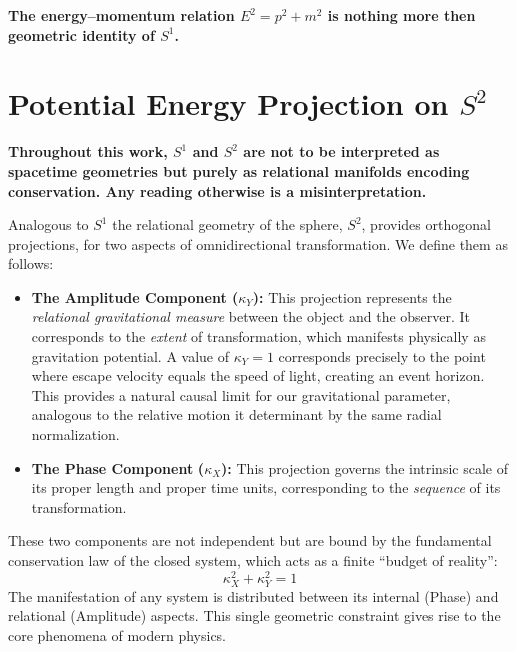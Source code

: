\documentclass[12pt, a4paper]{article}
\begin{document}
\begin{tcolorbox}[colback=gray!5, colframe=black!80!black, title=Summary:]
\textbf{The energy--momentum relation $E^{2}=p^{2}+m^{2}$ is nothing more then geometric identity of $S^1$.}
\end{tcolorbox}

\section{Potential Energy Projection on $S^2$}

\begin{tcolorbox}[colback=gray!5, colframe=black!80!black, title=IMPORTANT:]
\textbf{Throughout this work, $S^1$ and $S^2$ are not to be interpreted as spacetime geometries but purely as relational manifolds encoding conservation. Any reading otherwise is a misinterpretation.}
\end{tcolorbox}

Analogous to $S^1$ the relational geometry of the sphere, $S^2$, provides orthogonal projections,  for two aspects of omnidirectional transformation. We define them as follows:

\begin{itemize}
    \item \textbf{The Amplitude Component ($\kappa_Y$):} This projection represents the \textit{relational gravitational measure} between the object and the observer. It corresponds to the \textit{extent} of transformation, which manifests physically as gravitation potential. A value of $\kappa_Y=1$ corresponds precisely to the point where escape velocity equals the speed of light, creating an event horizon. This provides a natural causal limit for our gravitational parameter, analogous to the relative motion it determinant by the same radial normalization.

    \item \textbf{The Phase Component}\textbf{ ($\kappa_X$):} This projection governs the intrinsic scale of its proper length and proper time units, corresponding to the \textit{sequence} of its transformation.
\end{itemize}

These two components are not independent but are bound by the fundamental conservation law of the closed system, which acts as a finite ``budget of reality'':
$$
\kappa_X^2 + \kappa_Y^2 = 1
$$
The manifestation of any system is distributed between its internal (Phase) and relational (Amplitude) aspects. This single geometric constraint gives rise to the core phenomena of modern physics.
\end{document}

